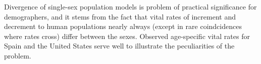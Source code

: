 

Divergence of single-sex population models is problem of practical significance
for demographers, and it stems from the fact that vital rates of increment and
decrement to human populations nearly always (except in rare coindcidences where
rates cross) differ between the sexes. Observed age-specific vital rates for
Spain and the United States serve well to illustrate the peculiarities of the problem.  %







 










